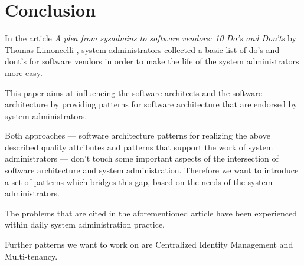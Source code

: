 \section{Conclusion} 


In the article \textit{A plea from sysadmins to software vendors: 10 Do's and Don'ts} by Thomas Limoncelli \cite{Limoncelli2011a}, system administrators collected a basic list of do's and dont's for software vendors in order to make the life of the system administrators more easy. 

This paper aims at influencing the software architects and the software architecture by providing patterns for software architecture that are endorsed by system administrators.


Both approaches --- software architecture patterns for realizing the above described quality attributes and patterns that support the work of system administrators --- don't touch some important aspects of the intersection of software architecture and system administration. Therefore we want
to introduce a set of patterns which bridges this gap, based on the needs of the system administrators. 

The problems that are cited in the aforementioned article have been experienced within daily system administration practice. 

Further patterns we want to work on are {\sc Centralized Identity Management} and {\sc Multi-tenancy}.


